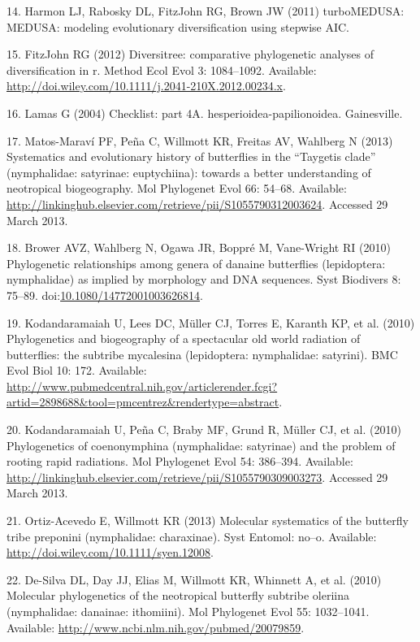 \documentclass[10pt]{article}
\begin{document}
14. Harmon LJ, Rabosky DL, FitzJohn RG, Brown JW (2011) turboMEDUSA:
MEDUSA: modeling evolutionary diversification using stepwise AIC.

15. FitzJohn RG (2012) Diversitree: comparative phylogenetic analyses of
diversification in r. Method Ecol Evol 3: 1084--1092. Available:
\url{http://doi.wiley.com/10.1111/j.2041-210X.2012.00234.x}.

16. Lamas G (2004) Checklist: part 4A. hesperioidea-papilionoidea.
Gainesville.

17. Matos-Maraví PF, Peña C, Willmott KR, Freitas AV, Wahlberg N (2013)
Systematics and evolutionary history of butterflies in the ``Taygetis
clade'' (nymphalidae: satyrinae: euptychiina): towards a better
understanding of neotropical biogeography. Mol Phylogenet Evol 66:
54--68. Available:
\url{http://linkinghub.elsevier.com/retrieve/pii/S1055790312003624}.
Accessed 29 March 2013.

18. Brower AVZ, Wahlberg N, Ogawa JR, Boppré M, Vane-Wright RI (2010)
Phylogenetic relationships among genera of danaine butterflies
(lepidoptera: nymphalidae) as implied by morphology and DNA sequences.
Syst Biodivers 8: 75--89.
doi:\href{http://dx.doi.org/10.1080/14772001003626814}{10.1080/14772001003626814}.

19. Kodandaramaiah U, Lees DC, Müller CJ, Torres E, Karanth KP, et al.
(2010) Phylogenetics and biogeography of a spectacular old world
radiation of butterflies: the subtribe mycalesina (lepidoptera:
nymphalidae: satyrini). BMC Evol Biol 10: 172. Available:
\url{http://www.pubmedcentral.nih.gov/articlerender.fcgi?artid=2898688\&tool=pmcentrez\&rendertype=abstract}.

20. Kodandaramaiah U, Peña C, Braby MF, Grund R, Müller CJ, et al.
(2010) Phylogenetics of coenonymphina (nymphalidae: satyrinae) and the
problem of rooting rapid radiations. Mol Phylogenet Evol 54: 386--394.
Available:
\url{http://linkinghub.elsevier.com/retrieve/pii/S1055790309003273}.
Accessed 29 March 2013.

21. Ortiz-Acevedo E, Willmott KR (2013) Molecular systematics of the
butterfly tribe preponini (nymphalidae: charaxinae). Syst Entomol:
no--o. Available: \url{http://doi.wiley.com/10.1111/syen.12008}.

22. De-Silva DL, Day JJ, Elias M, Willmott KR, Whinnett A, et al. (2010)
Molecular phylogenetics of the neotropical butterfly subtribe oleriina
(nymphalidae: danainae: ithomiini). Mol Phylogenet Evol 55: 1032--1041.
Available: \url{http://www.ncbi.nlm.nih.gov/pubmed/20079859}.
\end{document}
